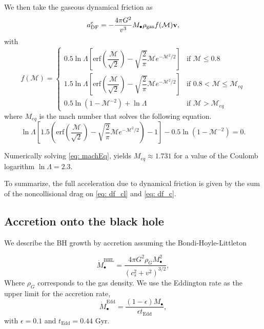 \documentclass[fleqn,usenatbib]{mnras}
\newcommand{\erf}[1]{\text{erf}\left(#1\right)}
\begin{document}
We then take the gaseous dynamical friction as 
\begin{equation}\label{eq: df_c}
a^\text{c}_\text{DF} = -\dfrac{4\pi G^2}{v^3}M_\bullet\rho_\text{gas}f(\mathcal{M}){\bf {v}},
\end{equation}
%			
with
\begin{equation}
f(\mathcal{M}) = \left\{
\begin{matrix}
0.5\ln\Lambda \left[\erf{\dfrac{\mathcal{M}}{\sqrt{2}}} - \sqrt{\dfrac{2}{\pi}}\mathcal{M}e^{-\mathcal{M}^2/2}\right]& \text{if $\mathcal{M} \leq 0.8$}\\
1.5\ln\Lambda \left[\erf{\dfrac{\mathcal{M}}{\sqrt{2}}} - \sqrt{\dfrac{2}{\pi}}\mathcal{M}e^{-\mathcal{M}^2/2}\right] & \text{if $0.8 < \mathcal{M} \leq \mathcal{M}_{eq}$}\\
0.5\ln\left(1 - \mathcal{M}^{-2}\right) + \ln\Lambda & \text{if $\mathcal{M} > \mathcal{M}_{eq}$}
\end{matrix}
\right.
\end{equation}
%
where $M_{eq}$ is the mach number that solves the following equation.
\begin{equation}\label{eq: machEq}
\ln\Lambda\left[1.5\left(\erf{\dfrac{\mathcal{M}}{\sqrt{2}}} - \sqrt{\dfrac{2}{\pi}}\mathcal{M}e^{-\mathcal{M}^2/2}\right) - 1\right] - 0.5\ln\left(1 - \mathcal{M}^{-2}\right) = 0.
\end{equation}
			
Numerically solving \autoref{eq: machEq}, yields $M_{eq} \approx 1.731$ for a value of the Coulomb logarithm $\ln\Lambda = 2.3$. 

To summarize, the full acceleration due to dynamical friction is given by the sum of the noncollisional drag on \autoref{eq: df_cl} and \autoref{eq: df_c}.
		
\subsection{Accretion onto the black hole}
			
			
We describe the BH growth by accretion assuming the Bondi-Hoyle-Littleton 

\begin{equation}
	\dot{M}_\bullet^\text{BHL} = \dfrac{4\pi G^2 \rho_GM^2_\bullet}{\left(c_s^2 + v^2\right)^{3/2}},
\end{equation}
%
Where $\rho_G$ corresponds to the gas density. We use the Eddington rate as the upper limit for the accretion rate,
\begin{equation}
	\dot{M}_\bullet^\text{Edd} = \dfrac{(1 - \epsilon)M_\bullet}{\epsilon t_\text{Edd}},
\end{equation}
%
with $\epsilon = 0.1$ and $t_\text{Edd} = 0.44 \text{ Gyr}$.
			
\end{document}
